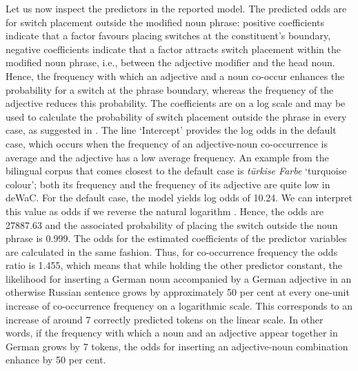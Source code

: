 Let us now inspect the predictors in the reported model. The predicted odds are for switch placement outside the modified noun phrase:  positive coefficients indicate that a factor favours placing switches at the constituent's boundary, negative coefficients indicate that a factor attracts switch placement within the modified noun phrase, i.e., between the adjective modifier and the head noun. Hence, the frequency with which an adjective and a noun co-occur enhances the probability for a switch at the phrase boundary, whereas the frequency of the adjective reduces this probability. The coefficients are on a log scale and may be used to calculate the probability of switch placement outside the phrase in every case, as suggested in \citet{ehret-etal-2014}. The line `Intercept' provides the log odds in the default case, which occurs when the frequency of an adjective-noun co-occurrence is average and the adjective has a low average frequency. An example from the bilingual corpus that comes closest to the default case is \textit{türkise Farbe} `turquoise colour'; both its frequency and the frequency of its adjective are quite low in deWaC. For the default case, the model yields log odds of 10.24. We can interpret this value as odds if we reverse the natural logarithm \citep[cf.][]{ehret-etal-2014}. Hence, the odds are 27887.63 and the associated probability of placing the switch outside the noun phrase is 0.999. The odds for the estimated coefficients of the predictor variables are calculated in the same fashion. Thus, for co-occurrence frequency the odds ratio is 1.455, which means that while holding the other predictor constant, the likelihood for inserting a German noun accompanied by a German adjective in an otherwise Russian sentence grows by approximately 50 per cent at every one-unit increase of co-occurrence frequency on a logarithmic scale. This corresponds to an increase of around 7 correctly predicted tokens on the linear scale. In other words, if the frequency with which a noun and an adjective appear together in German grows by 7 tokens, the odds for inserting an adjective-noun combination enhance by 50 per cent. 

